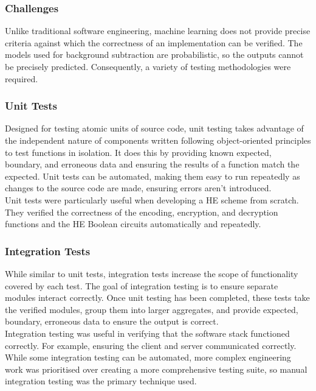 \subsubsection{Challenges}
\setlength{\leftskip}{0.5cm}
\indent \indent
Unlike traditional software engineering, machine learning does not provide precise criteria against which the correctness of an implementation can be verified. The models used for background subtraction are probabilistic, so the outputs cannot be precisely predicted.  Consequently, a variety of testing methodologies were required.

\setlength{\leftskip}{0cm}
\subsubsection{Unit Tests}
\setlength{\leftskip}{0.5cm}
\indent \indent
Designed for testing atomic units of source code, unit testing takes advantage of the independent nature of components written following object-oriented principles to test functions in isolation. It does this by providing known expected, boundary, and erroneous data and ensuring the results of a function match the expected. Unit tests can be automated, making them easy to run repeatedly as changes to the source code are made, ensuring errors aren't introduced.
\smallskip \\ \indent
Unit tests were particularly useful when developing a HE scheme from scratch. They verified the correctness of the encoding, encryption, and decryption functions and the HE Boolean circuits automatically and repeatedly.

\setlength{\leftskip}{0cm}
\subsubsection{Integration Tests}
\setlength{\leftskip}{0.5cm}
\indent \indent
While similar to unit tests, integration tests increase the scope of functionality covered by each test. The goal of integration testing is to ensure separate modules interact correctly. Once unit testing has been completed, these tests take the verified modules, group them into larger aggregates, and provide expected, boundary, erroneous data to ensure the output is correct.
\smallskip \\ \indent
Integration testing was useful in verifying that the software stack functioned correctly. For example, ensuring the client and server communicated correctly. While some integration testing can be automated, more complex engineering work was prioritised over creating a more comprehensive testing suite, so manual integration testing was the primary technique used.

